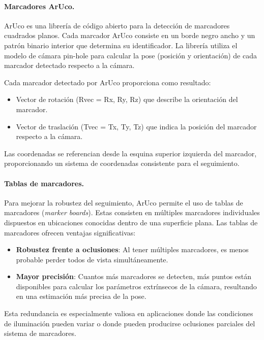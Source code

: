 \paragraph{Marcadores ArUco.}
ArUco es una librería de código abierto para la detección de marcadores cuadrados planos. Cada marcador ArUco consiste en un borde negro ancho y un patrón binario interior que determina su identificador. La librería utiliza el modelo de cámara pin-hole para calcular la \gls{pose} (posición y orientación) de cada marcador detectado respecto a la cámara.

Cada marcador detectado por ArUco proporciona como resultado:
\begin{itemize}
	\item Vector de rotación (Rvec = {Rx, Ry, Rz}) que describe la orientación del marcador.
	\item Vector de traslación (Tvec = {Tx, Ty, Tz}) que indica la posición del marcador respecto a la cámara.
\end{itemize}

Las coordenadas se referencian desde la esquina superior izquierda del marcador, proporcionando un sistema de coordenadas consistente para el seguimiento.

\paragraph{Tablas de marcadores.}
Para mejorar la robustez del seguimiento, ArUco permite el uso de tablas de marcadores (\emph{marker boards}). Estas consisten en múltiples marcadores individuales dispuestos en ubicaciones conocidas dentro de una superficie plana. Las tablas de marcadores ofrecen ventajas significativas:

\begin{itemize}
	\item \textbf{Robustez frente a oclusiones}: Al tener múltiples marcadores, es menos probable perder todos de vista simultáneamente.
	\item \textbf{Mayor precisión}: Cuantos más marcadores se detecten, más puntos están disponibles para calcular los parámetros extrínsecos de la cámara, resultando en una estimación más precisa de la pose.
\end{itemize}

Esta redundancia es especialmente valiosa en aplicaciones donde las condiciones de iluminación pueden variar o donde pueden producirse oclusiones parciales del sistema de marcadores.